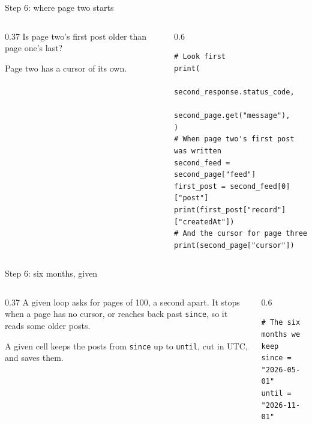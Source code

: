 \documentclass[9pt,aspectratio=169]{beamer}
\begin{document}
\begin{frame}[fragile]{Step 6: where page two starts}
    \begin{columns}[T]
        \begin{column}{0.37\textwidth}
            Is page two's first post older than page one's last?

            \medskip
            Page two has a cursor of its own.
        \end{column}
        \begin{column}{0.6\textwidth}
\begin{lstlisting}
# Look first
print(
    second_response.status_code,
    second_page.get("message"),
)
# When page two's first post was written
second_feed = second_page["feed"]
first_post = second_feed[0]["post"]
print(first_post["record"]["createdAt"])
# And the cursor for page three
print(second_page["cursor"])
\end{lstlisting}
        \end{column}
    \end{columns}
\end{frame}

\begin{frame}[fragile]{Step 6: six months, given}
    \begin{columns}[T]
        \begin{column}{0.37\textwidth}
            A given loop asks for pages of 100, a second apart. It stops when a page has no cursor, or reaches back past \texttt{since}, so it reads some older posts.

            \medskip
            A given cell keeps the posts from \texttt{since} up to \texttt{until}, cut in UTC, and saves them.
        \end{column}
        \begin{column}{0.6\textwidth}
\begin{lstlisting}
# The six months we keep
since = "2026-05-01"
until = "2026-11-01"
\end{lstlisting}
        \end{column}
    \end{columns}
\end{frame}
\end{document}
